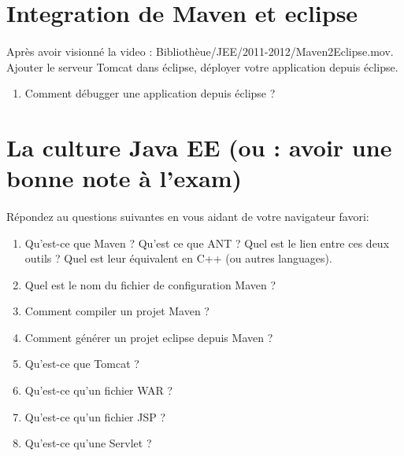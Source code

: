 \documentclass[a4,12pt]{article}
\begin{document}
\section{Integration de Maven et eclipse}
\paragraph{}
Après avoir visionné la video : Bibliothèue/JEE/2011-2012/Maven2Eclipse.mov. Ajouter le serveur Tomcat dans éclipse, déployer votre application depuis éclipse.
\begin{enumerate}
	\item Comment débugger une application depuis éclipse ?
\end{enumerate}

\section{La culture Java EE (ou : avoir une bonne note à l'exam)}
\paragraph{}
Répondez au questions suivantes en vous aidant de votre navigateur favori:
\begin{enumerate}
	\item Qu'est-ce que Maven ? Qu'est ce que ANT ? Quel est le lien entre ces deux outils ? Quel est leur équivalent en C++ (ou autres languages).
	\item Quel est le nom du fichier de configuration Maven ?
	\item Comment compiler un projet Maven ?
	\item Comment générer un projet eclipse depuis Maven ?
	\item Qu'est-ce que Tomcat ?
	\item Qu'est-ce qu'un fichier WAR ?
	\item Qu'est-ce qu'un fichier JSP ?
	\item Qu'est-ce qu'une Servlet ?
\end{enumerate}	
\end{document}
